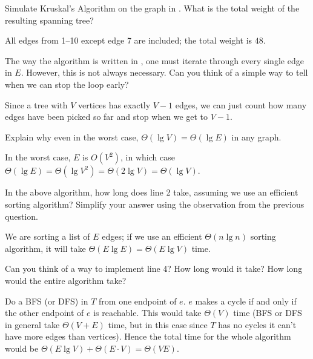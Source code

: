 \documentclass{tufte-handout}
\begin{document}
\begin{questions}
\item Simulate Kruskal's Algorithm on the graph in
  .  What is the total weight of the resulting
  spanning tree?

  \begin{answer}
  All edges from 1--10 except edge 7 are included; the total
  weight is $48$.
  \end{answer}

\newpage
\item The way the algorithm is written in , one
  must iterate through every single edge in $E$.  However, this is not
  always necessary.  Can you think of a simple way to tell when we can
  stop the loop early? 

  \begin{answer}
    Since a tree with $V$ vertices has exactly $V-1$ edges, we can
    just count how many edges have been picked so far and stop when we
    get to $V-1$.
  \end{answer}
\item Explain why even in the worst case,
  $\Theta(\lg V) = \Theta(\lg E)$ in any graph. 

  \begin{answer}
    In the worst case, $E$ is $O(V^2)$, in which case $\Theta(\lg
    E) = \Theta(\lg V^2) = \Theta(2 \lg V) = \Theta(\lg V)$.
  \end{answer}
\item In the above algorithm, how long does line 2 take, assuming we
  use an efficient sorting algorithm?  Simplify your answer using the
  observation from the previous question.

  \begin{answer}
    We are sorting a list of $E$ edges; if we use an efficient
    $\Theta(n \lg n)$ sorting algorithm, it will take $\Theta(E \lg E)
    = \Theta(E \lg V)$ time.
  \end{answer}
\item Can you think of a way to implement line 4?  How long would it
  take?  How long would the entire algorithm take?

  \begin{answer}
    Do a BFS (or DFS) in $T$ from one endpoint of $e$.  $e$
    makes a cycle if and only if the other endpoint of $e$ is
    reachable.  This would take $\Theta(V)$ time (BFS or DFS in
    general take $\Theta(V+E)$ time, but in this case since $T$ has no
    cycles it can't have more edges than vertices).  Hence the total
    time for the whole algorithm would be $\Theta(E \lg V) + \Theta(E
    \cdot V) = \Theta(VE)$.
  \end{answer}
\end{questions}
\end{document}
